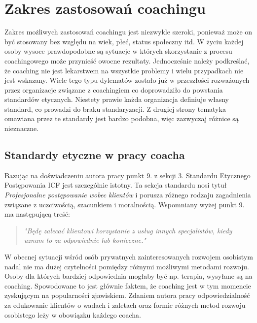 
\section{Zakres zastosowań coachingu}


Zakres możliwych zastosowań coachingu jest niezwykle szeroki, ponieważ może on być stosowany bez względu na wiek, płeć, status społeczny itd.
W życiu każdej osoby wysoce prawdopodobne są sytuacje w których skorzystanie z procesu coachingowego może przynieść owocne rezultaty.
Jednocześnie należy podkreślać, że coaching nie jest lekarstwem na wszystkie problemy i wielu przypadkach nie jest wskazany.
Wiele tego typu dylematów zostało już w przeszłości rozważonych przez organizacje związane z coachingiem co doprowadziło do powstania
standardów etycznych. Niestety prawie każda organizacja definiuje własny standard, co prowadzi do braku standaryzacji. Z drugiej strony
tematyka omawiana przez te standardy jest bardzo podobna, więc zazwyczaj różnice są nieznaczne.

\subsection{Standardy etyczne w pracy coacha}
Bazując na doświadczeniu autora pracy punkt 9. z sekcji 3. Standardu Etycznego Postępowania ICF \cite{kodeksicf} jest szczególnie istotny.
Ta sekcja standardu nosi tytuł \emph{Profesjonalne postępowanie wobec klientów} i porusza różnego rodzaju zagadnienia związane
z uczciwością, szacunkiem i moralnością. Wspomniany wyżej punkt 9. ma następującą treść:
\begin{quote}
\centering
\emph{ "Będę zalecać klientowi korzystanie z usług innych specjalistów, kiedy uznam to za odpowiednie lub konieczne."}
\end{quote}
W obecnej sytuacji wśród osób prywatnych zainteresowanych rozwojem osobistym nadal nie ma dużej czytelności pomiędzy różnymi
możliwymi metodami rozwoju. Osoby dla których bardziej odpowiednia mogłaby być np. terapia, wysyłane są na coaching. Spowodowane
to jest głównie faktem, że coaching jest w tym momencie zyskującym na popularności zjawiskiem. Zdaniem autora pracy odpowiedzialność
za edukowanie klientów o wadach i zaletach oraz formie różnych metod rozwoju osobistego leży w obowiązku każdego coacha.

